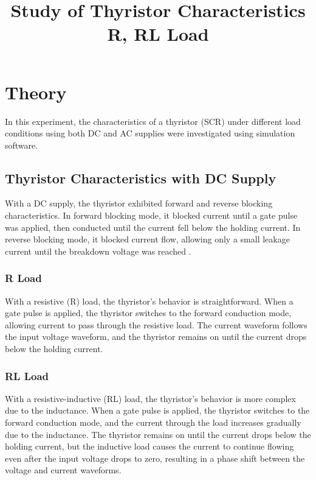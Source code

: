 \documentclass[12pt]{article}
\title{Study of Thyristor Characteristics R, RL Load}
\author{}
\date{}
\begin{document}


\pagebreak

\tableofcontents

\pagebreak
{}
\maketitle

\section*{Theory}
In this experiment, the characteristics of a thyristor (SCR) under different load conditions using both DC and AC supplies were investigated using simulation software.

\subsection*{Thyristor Characteristics with DC Supply}
With a DC supply, the thyristor exhibited forward and reverse blocking characteristics. In forward blocking mode, it blocked current until a gate pulse was applied, then conducted until the current fell below the holding current. In reverse blocking mode, it blocked current flow, allowing only a small leakage current until the breakdown voltage was reached \cite{thyristor_characteristics}.

\subsubsection*{R Load}
With a resistive (R) load, the thyristor's behavior is straightforward. When a gate pulse is applied, the thyristor switches to the forward conduction mode, allowing current to pass through the resistive load. The current waveform follows the input voltage waveform, and the thyristor remains on until the current drops below the holding current.

\subsubsection*{RL Load}
With a resistive-inductive (RL) load, the thyristor's behavior is more complex due to the inductance. When a gate pulse is applied, the thyristor switches to the forward conduction mode, and the current through the load increases gradually due to the inductance. The thyristor remains on until the current drops below the holding current, but the inductive load causes the current to continue flowing even after the input voltage drops to zero, resulting in a phase shift between the voltage and current waveforms.
\end{document}
